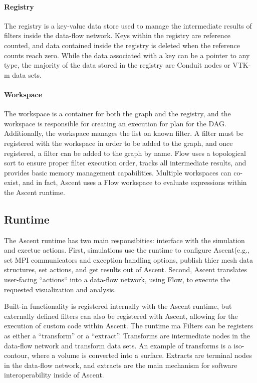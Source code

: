\paragraph{Registry}
The registry is a key-value data store used to manage the intermediate
results of filters inside the data-flow network.
%
Keys within the registry are reference counted, and data contained
inside the registry is deleted when the reference counts reach zero.
%
While the data associated with a key can be a pointer to any type,
the majority of the data stored in the registry are Conduit nodes
or VTK-m data sets.


\paragraph{Workspace}
The workspace is a container for both the graph and the registry,
and the workspace is responsible for creating an execution for plan
for the DAG.
%
Additionally, the workspace manages the list on known filter.
%
A filter must be registered with the workspace in order to be added to the
graph, and once registered, a filter can be added to the graph by name.
%
Flow uses a topological sort to ensure proper filter execution order,
tracks all intermediate results, and provides basic memory management capabilities.
%
Multiple workspaces can co-exist, and in fact, Ascent uses a Flow workspace
to evaluate expressions within the Ascent runtime.
%

\subsection{Runtime}
The Ascent runtime has two main responsibities:
interface with the simulation and exectue actions.
%
First, simulations use the runtime to configure Ascent(e.g., set MPI communicators and
exception handling options, publish thier mesh data structures, set actions,
and get results out of Ascent.
%
Second, Ascent translates user-facing ``actions`` into a data-flow network, using Flow,
to execute the requested visualization and analysis.
%


Built-in functionality is registered internally with the Ascent runtime,
but externally defined filters can also be registered with Ascent,
allowing for the execution of custom code within Ascent.
%
The runtime ma Filters can be registers as either a ``transform'' or a ``extract''.
%
Transforms are intermediate nodes in the data-flow network and transform
data sets.
%
An example of transforms is a iso-contour, where a volume is converted
into a surface.
%
Extracts are terminal nodes in the data-flow network, and extracts
are the main mechanism for software interoperability inside of Ascent.

